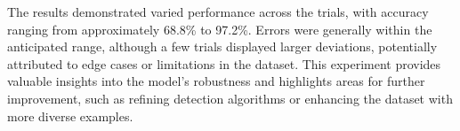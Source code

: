 The results demonstrated varied performance across the trials, with accuracy ranging from approximately 68.8\% to 97.2\%. Errors were generally within the anticipated range, although a few trials displayed larger deviations, potentially attributed to edge cases or limitations in the dataset. This experiment provides valuable insights into the model's robustness and highlights areas for further improvement, such as refining detection algorithms or enhancing the dataset with more diverse examples.
